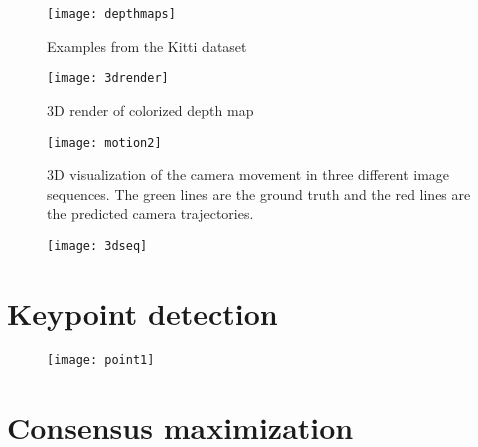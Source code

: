 \clearpage

\begin{figure}[H]
	\centering
	\texttt{[image: depthmaps]}
	\caption{Examples from the Kitti dataset}
	\label{fig:depthmapskitty}
\end{figure}


\begin{figure}[H]
	\centering
	\texttt{[image: 3drender]}
	\caption{3D render of colorized depth map}
	\label{fig:3drender}
\end{figure}

\begin{figure}[H]
	\centering
	\texttt{[image: motion2]}
	\caption{3D visualization of the camera movement in three different image sequences. The green lines are the ground truth and the red lines are the predicted camera trajectories.}
	\label{fig:movement}
\end{figure}

\begin{figure}[H]
	\centering
	\texttt{[image: 3dseq]}
	\caption{}
	\label{fig:3dseq}
\end{figure}

\section{Keypoint detection}

\begin{figure}[H]
	\centering
	\texttt{[image: point1]}
	\caption{}
	\label{fig:point1}
\end{figure}

\section{Consensus maximization}